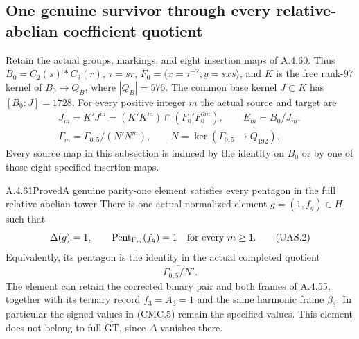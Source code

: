 \subsection{One genuine survivor through every relative-abelian coefficient quotient}

Retain the actual groups, markings, and eight insertion maps of A.4.60.
Thus $B_0=C_2(s)*C_3(r)$, $\tau=sr$,
$F_0=\langle x=\tau^{-2},y=sxs\rangle$, and $K$ is the free
rank-$97$ kernel of $B_0\to Q_B$, where $|Q_B|=576$.
The common base kernel $J\subset K$ has $[B_0:J]=1728$.
For every positive integer $m$ the actual source and target are
\[
 \begin{gathered}
 J_m=K'J^m=(K'K^m)\cap(F_0'F_0^{6m}),\qquad
 E_m=B_0/J_m,\\
 \Gamma_m=\Gamma_{0,5}/(N'N^m),\qquad
 N=\ker(\Gamma_{0,5}\to Q_{192}).
 \end{gathered}                                                   \tag{UAS.1}
\]
Every source map in this subsection is induced by the identity on
$B_0$ or by one of those eight specified insertion maps.

\begin{result}{A.4.61}{Proved}{A genuine parity-one element satisfies every pentagon in the full relative-abelian tower}
There is one actual normalized element $g=(1,f_g)\in H$ such that
\[
 \Delta(g)=1,\qquad
 \operatorname{Pent}_{\Gamma_m}(f_g)=1
                    \quad\hbox{for every }m\geq1.                 \tag{UAS.2}
\]
Equivalently, its pentagon is the identity in the actual completed
quotient
\[
                  \widehat{\Gamma_{0,5}/N'}.
                                                                    \tag{UAS.3}
\]
The element can retain the corrected binary pair and both frames of
A.4.55, together with its ternary record $f_3=A_3=1$ and the same
harmonic frame $\beta_3$.  In particular the signed values in
(CMC.5) remain the specified values.  This element does not belong
to full $\widehat{\mathrm{GT}}$, since $\Delta$ vanishes there.
\end{result}


